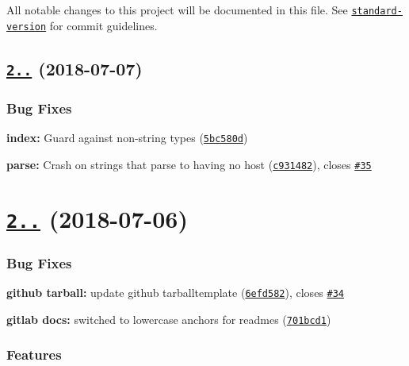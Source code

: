 All notable changes to this project will be documented in this file. See \href{https://github.com/conventional-changelog/standard-version}{\tt standard-\/version} for commit guidelines.

\label{_2.7.1}%
 \subsection*{\href{https://github.com/npm/hosted-git-info/compare/v2.7.0...v2.7.1}{\tt 2..} (2018-\/07-\/07)}

\subsubsection*{Bug Fixes}


\begin{DoxyItemize}
\item {\bfseries index\+:} Guard against non-\/string types (\href{https://github.com/npm/hosted-git-info/commit/5bc580d}{\tt 5bc580d})
\item {\bfseries parse\+:} Crash on strings that parse to having no host (\href{https://github.com/npm/hosted-git-info/commit/c931482}{\tt c931482}), closes \href{https://github.com/npm/hosted-git-info/issues/35}{\tt \#35}
\end{DoxyItemize}

\label{_2.7.0}%
 \section*{\href{https://github.com/npm/hosted-git-info/compare/v2.6.1...v2.7.0}{\tt 2..} (2018-\/07-\/06)}

\subsubsection*{Bug Fixes}


\begin{DoxyItemize}
\item {\bfseries github tarball\+:} update github tarballtemplate (\href{https://github.com/npm/hosted-git-info/commit/6efd582}{\tt 6efd582}), closes \href{https://github.com/npm/hosted-git-info/issues/34}{\tt \#34}
\item {\bfseries gitlab docs\+:} switched to lowercase anchors for readmes (\href{https://github.com/npm/hosted-git-info/commit/701bcd1}{\tt 701bcd1})
\end{DoxyItemize}

\subsubsection*{Features}


